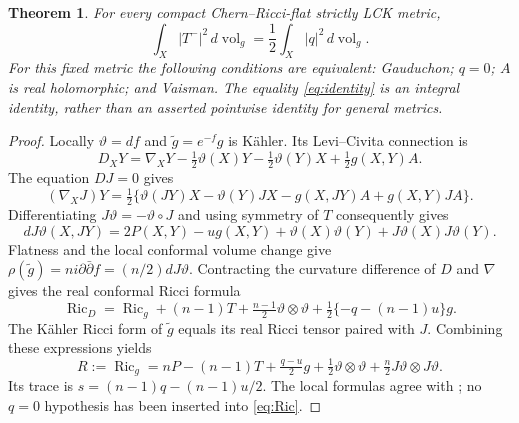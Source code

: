 \documentclass[11pt]{article}
\newtheorem{theorem}{Theorem}
\newcommand{\Ric}{\operatorname{Ric}}
\newcommand{\vol}{\operatorname{vol}}
\begin{document}
\begin{theorem}\label{th:rigidity}
For every compact Chern--Ricci-flat strictly LCK metric,
\begin{equation}\label{eq:identity}
 \int_X|T^-|^2\,d\vol_g=\frac12\int_X|q|^2\,d\vol_g.
\end{equation}
For this fixed metric the following conditions are equivalent:
Gauduchon; $q=0$; $A$ is real holomorphic; and Vaisman.
The equality \eqref{eq:identity} is an integral identity, rather than
an asserted pointwise identity for general metrics.
\end{theorem}

\begin{proof}
Locally $\vartheta=df$ and $\widetilde g=e^{-f}g$ is K\"ahler. Its
Levi--Civita connection is
\[
 D_XY=\nabla_XY-\tfrac12\vartheta(X)Y
                 -\tfrac12\vartheta(Y)X+\tfrac12g(X,Y)A.
\]
The equation $DJ=0$ gives
\begin{equation}\label{eq:nablaJ}
 (\nabla_XJ)Y=\tfrac12\{\vartheta(JY)X-\vartheta(Y)JX
                  -g(X,JY)A+g(X,Y)JA\}.
\end{equation}
Differentiating $J\vartheta=-\vartheta\circ J$ and using symmetry of
$T$ consequently gives
\[
 dJ\vartheta(X,JY)=2P(X,Y)-u g(X,Y)
              +\vartheta(X)\vartheta(Y)+J\vartheta(X)J\vartheta(Y).
\]
Flatness and the local conformal volume change give
$\rho(\widetilde g)=n i\partial\bar\partial f=(n/2)dJ\vartheta$.
Contracting the curvature difference of $D$ and $\nabla$ gives the
real conformal Ricci formula
\[
 \Ric_D=\Ric_g+(n-1)T+\tfrac{n-1}{2}\vartheta\otimes\vartheta
                       +\tfrac12\{-q-(n-1)u\}g.
\]
The K\"ahler Ricci form of $\widetilde g$ equals its real Ricci tensor
paired with $J$. Combining these expressions yields
\begin{equation}\label{eq:Ric}
 R:=\Ric_g=nP-(n-1)T+\tfrac{q-u}{2}g
               +\tfrac12\vartheta\otimes\vartheta
               +\tfrac n2J\vartheta\otimes J\vartheta.
\end{equation}
Its trace is
$s=(n-1)q-(n-1)u/2$. The local formulas agree with
\cite[Section 4, equations (2)--(4)]{BO}; no $q=0$ hypothesis has
been inserted into \eqref{eq:Ric}.


\end{proof}
\end{document}
